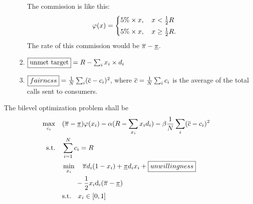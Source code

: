 \documentclass{article}
\begin{document}
\begin{enumerate}
\begin{enumerate}
    The commission is like this:
    \begin{equation}
      \com(x) = 
      \begin{cases}
        5\% \times x, \quad x < \frac12 \target \vspace{0.1cm}\\
        5\% \times x, \quad x \ge \frac12 \target.
      \end{cases}
    \end{equation}
    The rate of this commission would be $\overline{\pi} - \underline{\pi}$.
    \item $\boxed{\text{unmet target}} = R - \sum_{i} x_{i} \times d_{i}$
    \item $\boxed{fairness} = \frac{1}{N} \sum_{i} (\overline{c} - c_{i})^2$, where $\overline{c} = \frac{1}{N} \sum_{i} c_{i}$ is the average of the total calls sent to consumers.
  \end{enumerate}
\end{enumerate}


The bilevel optimization problem shall be  
\begin{subequations}
  \begin{align}
    \max_{c_{i}} \quad & (\overline{\pi} - \underline{\pi}) \varphi(x_{i}) - \alpha ( R - \sum_{x_{i}} x_{i} d_{i} ) - \beta \frac{1}{N} \sum_{i} (\overline{c} - c_{i})^2 \\
    \mathrm{s.t.} \quad & \sum_{i=1}^{N} c_{i} = R \\
    & \min_{x_{i}} \quad \overline{\pi} d_{i} (1 - x_{i}) + \underline{\pi} d_{i} x_{i} + \boxed{unwillingness} \\
    & \qquad - \frac{1}{2} x_{i} \text{d}_{i} (\overline{\pi} - \underline{\pi}) \notag \\
    & \mathrm{s.t.} \quad x_{i} \in [0,1]
  \end{align}
\end{subequations}
\end{document}
